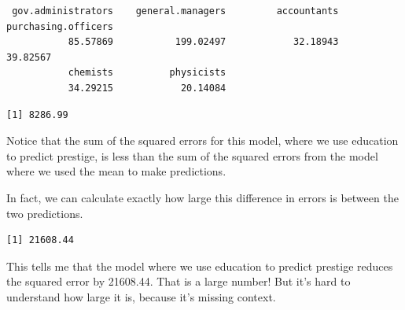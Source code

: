 \documentclass[
  letterpaper,
  DIV=11,
  numbers=noendperiod,
  oneside]{scrreprt}
\newenvironment{Shaded}{\begin{snugshade}}{\end{snugshade}}
\newcommand{\CommentTok}[1]{\textcolor[rgb]{0.37,0.37,0.37}{#1}}
\newcommand{\DecValTok}[1]{\textcolor[rgb]{0.68,0.00,0.00}{#1}}
\newcommand{\FunctionTok}[1]{\textcolor[rgb]{0.28,0.35,0.67}{#1}}
\newcommand{\NormalTok}[1]{\textcolor[rgb]{0.00,0.23,0.31}{#1}}
\newcommand{\OtherTok}[1]{\textcolor[rgb]{0.00,0.23,0.31}{#1}}
\newcommand{\SpecialCharTok}[1]{\textcolor[rgb]{0.37,0.37,0.37}{#1}}
\begin{document}
\begin{verbatim}
 gov.administrators    general.managers         accountants purchasing.officers 
           85.57869           199.02497            32.18943            39.82567 
           chemists          physicists 
           34.29215            20.14084 
\end{verbatim}

\begin{Shaded}
\end{Shaded}

\begin{verbatim}
[1] 8286.99
\end{verbatim}

Notice that the sum of the squared errors for this model, where we use
education to predict prestige, is less than the sum of the squared
errors from the model where we used the mean to make predictions.

In fact, we can calculate exactly how large this difference in errors is
between the two predictions.

\begin{Shaded}
\end{Shaded}

\begin{verbatim}
[1] 21608.44
\end{verbatim}

This tells me that the model where we use education to predict prestige
reduces the squared error by 21608.44. That is a large number! But it's
hard to understand how large it is, because it's missing context.
\end{document}
